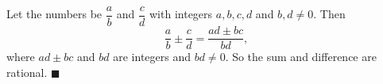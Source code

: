 Let the numbers be $\dfrac ab$ and $\dfrac cd$ with integers $a,b,c,d$ and $b,d\ne0$. Then
\[\dfrac ab\pm\dfrac cd=\dfrac{ad\pm bc}{bd},\]
where $ad\pm bc$ and $bd$ are integers and $bd\ne0$. So the sum and difference are rational. $\blacksquare$
